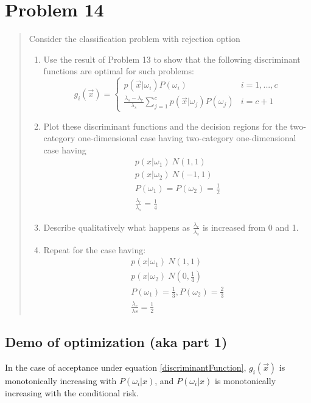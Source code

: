 \documentclass[11pt]{article}
\begin{document}
\section{Problem 14}
\begin{quote}
	Consider the classification problem with rejection option
	\begin{enumerate}
		\item Use the result of Problem 13 to show that the following discriminant functions are optimal for such problems: 
		\begin{equation}\label{discriminantFunction}
			g_i(\vec{x}) = 
		\left\{
		\begin{array}{ll}
		p(\vec{x} | \omega_i) P(\omega_i)  &   i = 1, ..., c  \\
		\frac{\lambda_s - \lambda_r}{\lambda_s}  \sum _{j=1} ^ c p(\vec{x} | \omega_j) P(\omega_j) & i = c + 1 
		\end{array}
		\right.
		\end{equation}
		\item Plot these discriminant functions and the decision regions for the two-category one-dimensional case having two-category one-dimensional case having
		\begin{eqnarray}
			p(x | \omega_1) ~ N (1,1) \\
			p(x | \omega_2) ~ N(-1, 1) \\
			P(\omega_1) = P(\omega_2) = \frac{1}{2} \\
			\frac{\lambda _r}{\lambda_s} = \frac{1}{4}
		\end{eqnarray}
		\item Describe qualitatively what happens as $\frac{\lambda_r}{\lambda_s}$ is increased from 0 and 1. 
		\item Repeat for the case having:
		\begin{eqnarray}
			p(x | \omega_1)  ~ N(1,1) \\
			p(x | \omega_2) ~ N ( 0, \frac{1}{4}) \\ 
			P(\omega_1) = \frac{1}{3}, P(\omega_2) = \frac{2}{3} \\
			\frac{\lambda_r}{\lambda{s}} = \frac{1}{2}
		\end{eqnarray}
	\end{enumerate}
	
\cite[68]{duda-hart-stork}
\end{quote}
\subsection{Demo of optimization (aka part 1)}
In the case of acceptance under equation \ref{discriminantFunction}, $g_i(\vec{x})$ is monotonically increasing with $P(\omega_i | x)$, and $P(\omega_i |x)$ is monotonically increasing with the conditional risk.    
\end{document}
